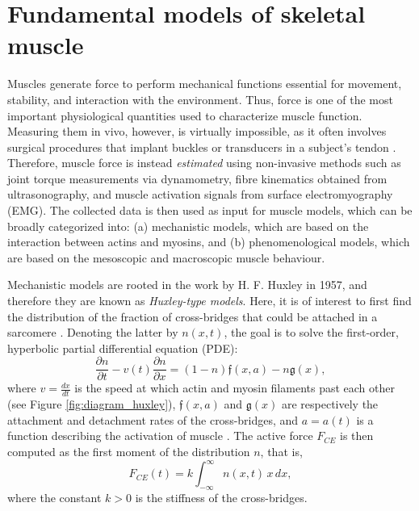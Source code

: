 \documentclass{sfuthesis}
\numberwithin{equation}{section}
\numberwithin{figure}{chapter}
\numberwithin{table}{chapter}
\theoremstyle{definition}
\newcommand{\pder}[2]{\dfrac{\partial #1}{\partial #2}}
\begin{document}
\section{Fundamental models of skeletal muscle}


Muscles generate force to perform mechanical functions essential for movement, stability, and interaction with the environment. Thus, force is one of the most important physiological quantities used to characterize muscle function. Measuring them in vivo, however, is virtually impossible, as it often involves surgical procedures that implant buckles or transducers in a subject's tendon \cite{Biewener1998KangarooRats,Komi1990}. Therefore, muscle force is instead \textit{estimated} using non-invasive methods such as joint torque measurements via dynamometry, fibre kinematics obtained from ultrasonography, and muscle activation signals from surface electromyography (EMG). The collected data is then used as input for muscle models, which can be broadly categorized into: (a) mechanistic models, which are based on the interaction between actins and myosins, and (b) phenomenological models, which are based on the mesoscopic and macroscopic muscle behaviour.

Mechanistic models are rooted in the work by H. F. Huxley \cite{Huxley1957} in 1957, and therefore they are known as \textit{Huxley-type models}. Here, it is of interest to first find the distribution of the fraction of cross-bridges that could be attached in a sarcomere \cite{GordonHuxleyJulian1966, Huxley1957}. Denoting the latter by $n(x,t)$, the goal is to solve the first-order, hyperbolic partial differential equation (PDE):
\[
 \pder{n}{t} - v(t) \pder{n}{x} = (1-n) \mathfrak{f}(x,a) - n \mathfrak{g}(x),
\]
where $v = \frac{dx}{dt}$ is the speed at which actin and myosin filaments past each other (see Figure \ref{fig:diagram_huxley}), $\mathfrak{f}(x,a)$ and $\mathfrak{g}(x)$ are respectively the attachment and detachment rates of the cross-bridges, and $a = a(t)$ is a function describing the activation of muscle \cite{Milicevic2022HuxleySurrogates}. The active force $F_{CE}$ is then computed as the first moment of the distribution $n$, that is,
\[
F_{CE}(t) = k \int_{-\infty}^\infty n(x,t) \, x \, dx,
\]
where the constant $k > 0$ is the stiffness of the cross-bridges. 
\end{document}
